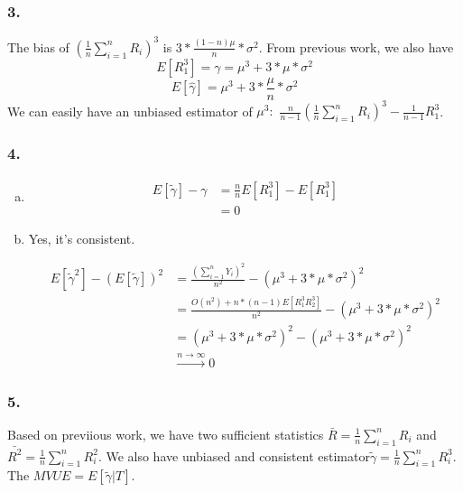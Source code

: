 \documentclass[11pt]{article}
\begin{document}
\subsubsection*{3.}
The bias of  $(\frac{1}{n} \sum_{i=1}^{n} R_{i})^3$ is $3*\frac{(1-n)\mu}{n}*\sigma^2$. From previous work, we also have
$$E[R_1^3]=\gamma = \mu^3 + 3*\mu*\sigma^2$$
$$E[\hat \gamma] = \mu^3 + 3*\frac{\mu}{n}*\sigma^2$$
We can easily have an unbiased estimator of $\mu^3:$ $\frac{n}{n-1}(\frac{1}{n} \sum_{i=1}^{n} R_{i})^3 - \frac{1}{n-1}R_1^3$.

\subsubsection*{4.}
\begin{enumerate}[(a)]
	\item
\begin{align*}
E[\tilde{\gamma}] - \gamma &= \frac{n}{n}E[R_1^3] - E[R_1^3]\\
& = 0
\end{align*}
	\item Yes, it's consistent.


\begin{align*}
E[\tilde \gamma^2] - (E[\tilde \gamma])^2 &= \frac{(\sum\limits_{i=1}^{n}Y_i)^2}{n^2} - (\mu^3+3*\mu*\sigma^2)^2\\
&= \frac{O(n^2)+ n*(n-1)E[R_1^3R_2^3]}{n^2}- (\mu^3+3*\mu*\sigma^2)^2\\
& = (\mu^3+3*\mu*\sigma^2)^2 - (\mu^3+3*\mu*\sigma^2)^2\\
&\stackrel{n\rightarrow \infty}{\longrightarrow}0
\end{align*}


\end{enumerate}


\subsubsection*{5.}
Based on previious work, we have two sufficient statistics $\bar R = \frac{1}{n} \sum_{i=1}^{n} R_{i}$ and $\bar {R^2} = \frac{1}{n} \sum_{i=1}^{n} R_{i}^2$. We also have unbiased and consistent estimator$\tilde{\gamma}=\frac{1}{n} \sum_{i=1}^{n} R_{i}^{3}$.\\
The $MVUE = E[\tilde{\gamma}|T]$.
\end{document}
